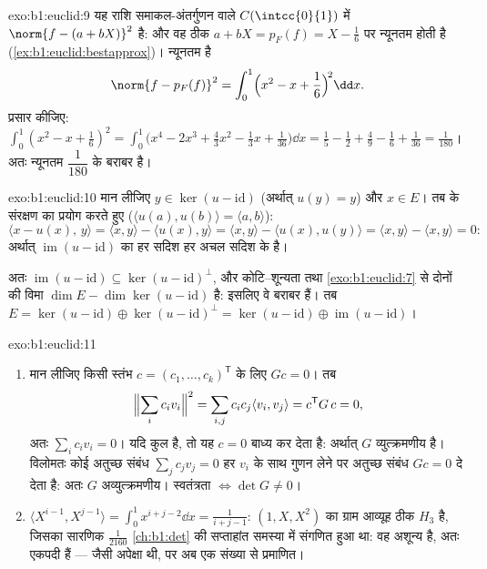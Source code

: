 \begin{solution}{exo:b1:euclid:9}
यह राशि समाकल-अंतर्गुणन वाले $C(\intcc{0}{1})$ में $\norm{f - (a + bX)}^2$
है: और वह ठीक  $a + bX = p_F(f) = X - \frac16$ पर न्यूनतम
होती है (\cref{ex:b1:euclid:bestapprox})। न्यूनतम है
\[
\norm{f - p_F(f)}^2 = \int_0^1 \Bigl(x^2 - x + \frac16\Bigr)^{\!2}
\dd x .
\]
प्रसार कीजिए: $\int_0^1 (x^2 - x + \frac16)^2 = \int_0^1 \bigl(x^4 - 2x^3 +
\frac{4}{3}x^2 - \frac13 x + \frac{1}{36}\bigr)\dd x = \frac15 - \frac12 +
\frac49 - \frac16 + \frac{1}{36} = \frac{1}{180}$। अतः न्यूनतम
$\dfrac{1}{180}$ के बराबर है।
\end{solution}

\begin{solution}{exo:b1:euclid:10}
मान लीजिए $y \in \ker(u - \mathrm{id})$ (अर्थात् $u(y) = y$) और $x \in E$।
तब  के संरक्षण का प्रयोग करते हुए ($\langle u(a), u(b)\rangle =
\langle a, b\rangle$):
\[
\langle x - u(x),\, y\rangle
= \langle x, y\rangle - \langle u(x), y\rangle
= \langle x, y\rangle - \langle u(x), u(y)\rangle
= \langle x, y\rangle - \langle x, y\rangle = 0 :
\]
अर्थात् $\operatorname{im}(u - \mathrm{id})$ का हर सदिश हर अचल सदिश के
 है।

अतः $\operatorname{im}(u - \mathrm{id}) \subseteq \ker(u -
\mathrm{id})^{\perp}$, और कोटि--शून्यता तथा \cref{exo:b1:euclid:7} से दोनों
की विमा $\dim E - \dim\ker(u - \mathrm{id})$ है: इसलिए वे बराबर हैं। तब $E =
\ker(u - \mathrm{id}) \oplus \ker(u - \mathrm{id})^\perp = \ker(u -
\mathrm{id}) \oplus \operatorname{im}(u - \mathrm{id})$।
\end{solution}

\begin{solution}{exo:b1:euclid:11}
\begin{enumerate}
  \item मान लीजिए किसी स्तंभ $c = (c_1, \dots, c_k)^{\mathsf T}$ के लिए $Gc
  = 0$। तब
        \[
        \Bigl\lVert\sum_i c_i v_i\Bigr\rVert^2
        = \sum_{i,j} c_i c_j \langle v_i, v_j\rangle
        = c^{\mathsf T} G\, c = 0,
        \]
        अतः $\sum_i c_i v_i = 0$। यदि कुल  है, तो यह $c = 0$ बाध्य
        कर देता है: अर्थात् $G$ व्युत्क्रमणीय है। विलोमतः कोई अतुच्छ संबंध
        $\sum_j c_j v_j = 0$ हर $v_i$ के साथ गुणन लेने पर अतुच्छ संबंध $Gc =
        0$ दे देता है: अतः $G$ अव्युत्क्रमणीय। स्वतंत्रता $\iff \det G \neq
        0$।
  \item $\langle X^{i-1}, X^{j-1}\rangle = \int_0^1 x^{i+j-2}\dd x =
  \frac{1}{i+j-1}$: $(1, X, X^2)$ का ग्राम आव्यूह ठीक  $H_3$
  है, जिसका सारणिक $\frac1{2160}$ \cref{ch:b1:det} की सप्ताहांत समस्या में
  संगणित हुआ था: वह अशून्य है, अतः एकपदी  हैं --- जैसी अपेक्षा थी,
  पर अब एक संख्या से प्रमाणित।
\end{enumerate}
\end{solution}

